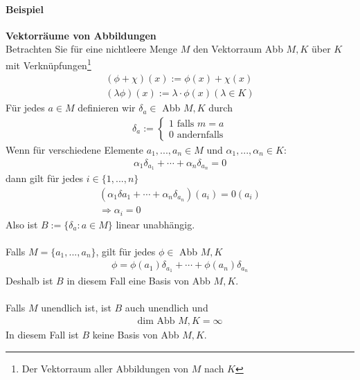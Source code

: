 \documentclass[11pt]{report}
\newcommand*\f[1] {\textbf{#1}}
\begin{document}
\paragraph{Beispiel} \f{Vektorräume von Abbildungen}\\
Betrachten Sie für eine nichtleere Menge $M$ den Vektorraum Abb $M,K$ über $K$ mit Verknüpfungen\footnote{Der Vektorraum aller Abbildungen von $M$ nach $K$}
\begin{align}
 (\phi +\chi)(x) := \phi(x) + \chi(x) \\
 (\lambda \phi)(x) := \lambda\cdot\phi(x) (\lambda \in K)
\end{align}
Für jedes $a \in M$ definieren wir $\delta_a \in$ Abb $M,K$ durch
\begin{align}
 \delta_a := \left\{ \begin{matrix} 1 \text{ falls $m=a$} \\ 0 \text{ andernfalls}\end{matrix}\right.
\end{align}
Wenn für verschiedene Elemente $a_1, ..., a_n \in M$ und $\alpha_1, ..., \alpha_n \in K$:
\begin{align}
 \alpha_1 \delta_{a_1} + \cdots + \alpha_n \delta_{a_n} = 0
\end{align}
dann gilt für jedes $i \in \{1, ..., n\}$
\begin{align}
 (\alpha_1 \delta{a_1} + \cdots + \alpha_n \delta_{a_n})(a_i) = 0(a_i)\\
\Rightarrow \alpha_i = 0
\end{align}
Also ist $B := \{\delta_a: a \in M\}$ linear unabhängig. \\\\
Falls $M = \{a_1, ..., a_n\}$, gilt für jedes $\phi \in$ Abb $M, K$
\begin{align}
 \phi = \phi(a_1)\delta_{a_1} + \cdots + \phi(a_n)\delta_{a_n}
\end{align}
Deshalb ist $B$ in diesem Fall eine Basis von Abb $M,K$.\\\\
Falls $M$ unendlich ist, ist $B$ auch unendlich und 
\begin{align}
 \text{dim Abb } M,K = \infty
\end{align}
In diesem Fall ist $B$ keine Basis von Abb $M,K$.
\end{document}
